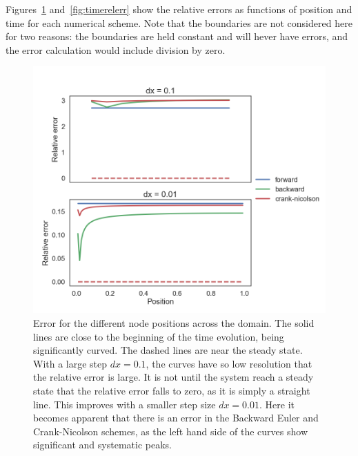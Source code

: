 \documentclass[aps,reprint]{revtex4-1}
\begin{document}
Figures~\ref{fig:posrelerr} and~\ref{fig:timerelerr} show the relative errors as functions
of position and time for each numerical scheme. Note that the boundaries are not considered
here for two reasons: the boundaries are held constant and will hever have errors,
and the error calculation would include division by zero.
\begin{figure}[ht]
  \centering
  \includegraphics[width=\columnwidth]{figures/relative_error_in_position.png}
  \caption{\label{fig:posrelerr} Error for the different node positions across
    the domain. The solid lines are close to the beginning of the time
    evolution, being significantly curved.  The dashed lines are near the steady
    state. With a large step \(dx = 0.1\), the curves have so low resolution
  that the relative error is large. It is not until the system reach a steady
  state that the relative error falls to zero, as it is simply a straight line.
  This improves with a smaller step size \(dx = 0.01\). Here it becomes apparent
that there is an error in the Backward Euler and Crank-Nicolson schemes, as the
left hand side of the curves show significant and systematic peaks.}
\end{figure}
\end{document}
